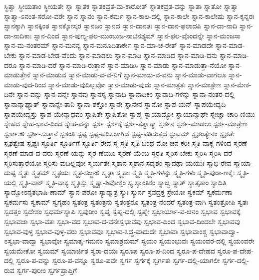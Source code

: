 {ಸ್ಥಿತ್ವಾ
ಸ್ಥೀಯತಾಂ
ಸ್ಥೀಯತೇ
ಸ್ನಾ
ಸ್ನಾತಕ
ಸ್ನಾತಕವ್ರತ-ಮ-ಕಾರೋತ್
ಸ್ನಾತಕವ್ರತ-ವನ್ನು
ಸ್ನಾತಾ
ಸ್ನಾತೋ
ಸ್ನಾತ್ವಾ
ಸ್ನಾತ್ವಾ-ಽನಂತ-ಸರೋ-ವರೇ
ಸ್ನಾನ
ಸ್ನಾನಂ
ಸ್ನಾನ-ಕರ್ಮ
ಸ್ನಾನ-ಕಾಲ-ದಲ್ಲಿ
ಸ್ನಾನ-ಕಾಲೇ
ಸ್ನಾನ-ಕಾಲೇಷು
ಸ್ನಾನ-ಕೃನ್ನರಃ
ಸ್ನಾನಕ್ಕಾಗಿ
ಸ್ನಾನಕ್ಕಿಂತ
ಸ್ನಾನಕ್ಕೋಸ್ಕರ
ಸ್ನಾನಜಂ
ಸ್ನಾನದ
ಸ್ನಾನ-ದಾನತಃ
ಸ್ನಾನ-ದಾನ-ಫಲಾದಪಿ
ಸ್ನಾನ-ದಾ-ನಾದಿ
ಸ್ನಾನ-ದಾ-ನಾದಿಕಾಃ
ಸ್ನಾನ-ದಿಂದ
ಸ್ನಾನ-ಪುಣ್ಯ-ಫಲ-ಮುಂಬುಜ-ನಾಭನಶ್ಯಮ್
ಸ್ನಾನ-ಫಲ-ವೊಂದನ್ನೇ
ಸ್ನಾನ-ಮಂಜಸಾ
ಸ್ನಾನ-ಮ-ನಂತರಮ್
ಸ್ನಾನ-ಮನನ್ಯ
ಸ್ನಾನ-ಮನೂದಿತಾರ್ಕೇ
ಸ್ನಾನ-ಮಾ-ಚ-ರೇತ್
ಸ್ನಾನ-ಮಾಡದೇ
ಸ್ನಾನ-ಮಾಡ-ಬೇಕು
ಸ್ನಾನ-ಮಾಡ-ಬೇಡ-ವೆಂದು
ಸ್ನಾನ-ಮಾಡಲು
ಸ್ನಾನ-ಮಾಡಿ
ಸ್ನಾನ-ಮಾಡಿದ
ಸ್ನಾನ-ಮಾಡಿ-ದನು
ಸ್ನಾನ-ಮಾಡಿ-ದರೂ
ಸ್ನಾನ-ಮಾಡಿ-ದರೆ
ಸ್ನಾನ-ಮಾಡಿ-ರುತ್ತಾನೆ
ಸ್ನಾನ-ಮಾಡಿಸಿ
ಸ್ನಾನ-ಮಾಡು
ಸ್ನಾನ-ಮಾಡುತ್ತಾ-ನೆಯೋ
ಸ್ನಾನ-ಮಾಡುತ್ತೇನೆ
ಸ್ನಾನ-ಮಾಡುವ
ಸ್ನಾನ-ಮಾಡು-ವ-ವ-ನಿಗೆ
ಸ್ನಾನ-ಮಾಡು-ವ-ವನು
ಸ್ನಾನ-ಮಾಡು-ವಾಗಲೂ
ಸ್ನಾನ-ಮಾಡು-ವುದ-ರಿಂದ
ಸ್ನಾನ-ಮಾಡು-ವುದಿಲ್ಲವೋ
ಸ್ನಾನ-ಮಾಡು-ವುದು
ಸ್ನಾನ-ಮಾತ್ರತಃ
ಸ್ನಾನ-ಮಾತ್ರೇಣ
ಸ್ನಾನ-ಮೇಕ-ದಿನೇ
ಸ್ನಾನ-ವನ್ನು
ಸ್ನಾನ-ವನ್ನೇ
ಸ್ನಾನವು
ಸ್ನಾನಸ್ಯ
ಸ್ನಾನಾದಿ
ಸ್ನಾನಾದಿಕಂ
ಸ್ನಾನಾದಿ-ಗಳನ್ನು
ಸ್ನಾನಾ-ನಂತರ-ದಲ್ಲಿ
ಸ್ನಾನಾನ್ಮಾಘ್ಯಾತ್
ಸ್ನಾನಾನ್ಯೇ-ತಾನಿ
ಸ್ನಾನಾ-ಶಕ್ತೋ
ಸ್ನಾನೇ
ಸ್ನಾನೇನ
ಸ್ನಾನೋ
ಸ್ನಾಪ-ಯನ್
ಸ್ನಾಪಯೇದ್ಯದಿ
ಸ್ನಾಪಯೇದ್ಯಸ್ತು
ಸ್ನಾಪ-ಯೇನ್ಮಾಧವಂ
ಸ್ನಾಪಿತೇ
ಸ್ನಾಪಿತೋ
ಸ್ನಾಪ್ಯ
ಸ್ನಾಯಾದ್ಯೋ
ಸ್ನಾಯಾನ್ಮಾಘೇ
ಸ್ನೇಚ್ಚಾ-ಚಾರಿ-ಣಿಯು
ಸ್ನೇಹದ
ಸ್ನೇಹ-ಭಾವ-ದಿಂದ
ಸ್ನೇಹ-ವನ್ನು
ಸ್ಪರ್ಶ
ಸ್ಪರ್ಶಕ್ಕೆ
ಸ್ಪರ್ಶ-ತತ್ವಾತ್ಮಾ
ಸ್ಪರ್ಶನ
ಸ್ಪರ್ಶ-ಮಾಡಲು
ಸ್ಪರ್ಶ-ಮಾತ್ರೇಣ
ಸ್ಪರ್ಶಾಶೌ
ಸ್ಪರ್ಶಿ-ಸುತ್ತಾನೆ
ಸ್ಪಶಂತಿ
ಸ್ಪಷ್ಟ
ಸ್ಪಷ್ಟ-ಪಡಿಸಲಾಗಿದೆ
ಸ್ಪಷ್ಟ-ಪಡಿಸುತ್ತದೆ
ಸ್ಪುಟಮ್
ಸ್ಪೃಶಂತ್ಯೇನಂ
ಸ್ಪೃಶತೇ
ಸ್ಪೃಶತ್ವೇಷ
ಸ್ಪೃಷ್ಟಃ
ಸ್ಫೂರ್ತಿ
ಸ್ಫೂರ್ತಿಗೆ
ಸ್ಫೂರ್ತಿ-ರೇವ
ಸ್ಮ
ಸ್ಮತಿ
ಸ್ಮತಿ-ಬಂಧ-ಮೋ-ಚನ-ಕರೀ
ಸ್ಮತಿ-ವಾಕ್ಯ-ಗಳಿಂದ
ಸ್ಮರಣೆ
ಸ್ಮರಣೆ-ಮಾಡ-ದ-ವರು
ಸ್ಮರಣೆ-ಯನ್ನು
ಸ್ಮರ-ಣೆಯೂ
ಸ್ಮರಣೆ-ಯೆಂಬ
ಸ್ಮರತಿ
ಸ್ಮರಿಸ-ಬೇಕು
ಸ್ಮರಿಸಿ
ಸ್ಮರಿಸಿ-ದರೆ
ಸ್ಮರಿಸುತ್ತಾರೆಯೋ
ಸ್ಮರಿಸು-ವುದಿಲ್ಲವೋ
ಸ್ಮರ್ಯತೇ
ಸ್ಮಶಾನ
ಸ್ಮಶಾನ-ಸದೃಶಂ
ಸ್ಮಾದಥಾ-ಯಯುಃ
ಸ್ಮಾಭಿ-ರೇವ
ಸ್ಮಾಯಾ-ದುಷ್ಟ
ಸ್ಮೃತಃ
ಸ್ಮೃತಮ್
ಸ್ಮೃತಯಃ
ಸ್ಮೃತ-ಸಜ್ಜನೌ
ಸ್ಮೃತಾ
ಸ್ಮೃತಾಃ
ಸ್ಮೃತಿ
ಸ್ಮೃತಿ-ಗಳನ್ನು
ಸ್ಮೃತಿ-ಗಳು
ಸ್ಮೃತಿ-ಪುರಾ-ಣಕೈಃ
ಸ್ಮೃತಿ-ಯಲ್ಲಿ
ಸ್ಮೃತಿ-ವಾಕ್
ಸ್ಮೃತಿ-ವಾಕ್ಯ
ಸ್ಮೃತಿಸ್ತು
ಸ್ಮೃತ್ವಾ-ಶಿವೋಕ್ತಂ
ಸ್ಯ
ಸ್ಯಾಂತಿಕಂ
ಸ್ಯಾಚ್ಚ
ಸ್ಯಾತ್
ಸ್ಯಾತ್ಸತಾಂ
ಸ್ಯಾದಿತಿ
ಸ್ಯಾದ್ವೋಽನೃತಭಾಷಿ-ಣಾಮ್
ಸ್ಯಾನ-ಪರೋ
ಸ್ಯಾನ್ಮಾತ್ರ
ಸ್ಯುಃ
ಸ್ಯುರ್ನ
ಸ್ರವದ್ರಕ್ತ
ಸ್ರೇಯೋ
ಸ್ವಕಮ್
ಸ್ವಕರ್ಮಣಾ
ಸ್ವಕರ್ಮಸು
ಸ್ವಕಾಮ್
ಸ್ವಗೃಹಂ
ಸ್ವತಂತ್ರ
ಸ್ವತಂತ್ರನು
ಸ್ವತಂತ್ರನೂ
ಸ್ವತಂತ್ರ-ನೆಂದರೆ
ಸ್ವತಂತ್ರ-ವಾಗಿ
ಸ್ವತಂತ್ರೋಪಿ
ಸ್ವತಃ
ಸ್ವದತ್ತಂ
ಸ್ವದೇಶಂ
ಸ್ವಧರ್ಮಸ್ಯಾಪಿ
ಸ್ವಪುರೀಂ
ಸ್ವಪ್ನ
ಸ್ವಪ್ನ-ದಲ್ಲಿ
ಸ್ವಪ್ನೇ
ಸ್ವಭಾರ್ಯಾ-ವ-ಚನಂ
ಸ್ವಭಾವ
ಸ್ವಭಾವಕ್ಕೆ
ಸ್ವಭಾವಜಾ
ಸ್ವಭಾ-ವತಃ
ಸ್ವಭಾ-ವದ
ಸ್ವಭಾವ-ದ-ವನೇಸ್ವಭಾವವು
ಸ್ವಭಾವ-ದಿಂದ
ಸ್ವಭಾವ-ದಿಂದಲೇ
ಸ್ವಭಾವವು
ಸ್ವಭಾವ-ವುಳ್ಳ
ಸ್ವಭಾವ-ವುಳ್ಳ-ವರು
ಸ್ವಭಾವವೂ
ಸ್ವಭಾವ-ಸಿದ್ಧ-ವಾದುದೇ
ಸ್ವಭಾವಾ
ಸ್ವಭಾವಾಂಶ್ಚ
ಸ್ವಭಾವಾದ್ವಾ-ಽಸ್ವಭಾ-ವಾದ್ವಾ
ಸ್ವಭಾವೋ
ಸ್ವಮಾತೃ-ಗಮನಂ
ಸ್ವಮಾಶ್ರಮಮ್
ಸ್ವಯಂ
ಸ್ವಯಂಭುವಃ
ಸ್ವಯಂವರ-ದಲ್ಲಿ
ಸ್ವಯಂವರೇ
ಸ್ವಯಮೇಕೋ
ಸ್ವಯಮ್
ಸ್ವಯಾರ್ಜಿತ
ಸ್ವರಾ-ದಯಃ
ಸ್ವರೂಪ
ಸ್ವರೂ-ಪ-ದಿಂದ
ಸ್ವರೂ-ಪ-ದೇಹದ
ಸ್ವರೂ-ಪ-ದೇಹ-ದಲ್ಲಿ
ಸ್ವರೂ-ಪ-ವನ್ನು
ಸ್ವರೂ-ಪ-ವನ್ನೂ
ಸ್ವರೂ-ಪವೇ
ಸ್ವರ್ಗ
ಸ್ವರ್ಗಕ್ಕೆ
ಸ್ವರ್ಗತಃ
ಸ್ವರ್ಗ-ದಲ್ಲಿ-ಯಾಗಲೀ
ಸ್ವರ್ಗ-ದಲ್ಲಿ-ರುವ
ಸ್ವರ್ಗ-ಪುರೀಂ
ಸ್ವರ್ಗಪ್ರಾಪ್ತಿಗೆ
}
